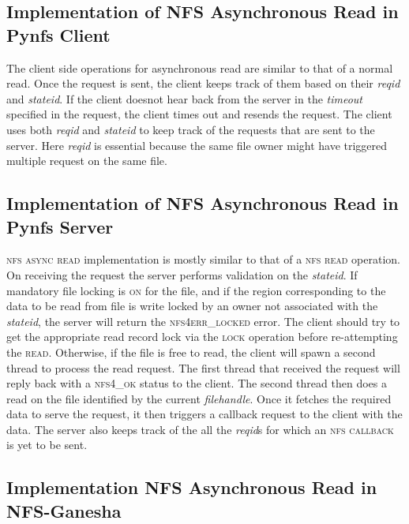 \subsection{Implementation of NFS Asynchronous Read in Pynfs Client}
 
The client side operations for asynchronous read are similar to that of a normal read. Once the request is sent, the client keeps track of them based on their \textit{reqid} and \textit{stateid}. If the client doesnot hear back from the server in the \textit{timeout} specified in the request, the client times out and resends the request. The client uses both \textit{reqid} and \textit{stateid} to keep track of the requests that are sent to the server.  Here \textit{reqid} is essential because the same file owner might have triggered multiple request on the same file.  
  
\subsection{Implementation of NFS Asynchronous Read in Pynfs Server}
 \textsc{nfs async read} implementation is mostly similar to that of a \textsc{nfs read} operation. On receiving the request the server performs validation on the \textit{stateid}. If mandatory file locking is \textsc{on} for the file, and if the region corresponding to the data to be read from file is write locked by an owner not associated with the \textit{stateid}, the server will return the \textsc{nfs4err\_locked} error. The client should try to get the appropriate read record lock via the \textsc{lock} operation before re-attempting the \textsc{read}. Otherwise, if the file is free to read, the client will spawn a second thread to process the read request. The first thread that received the request will reply back with a \textsc{nfs4\_ok} status to the client. The second thread then does a read on the file identified by the current \textit{filehandle}. Once it fetches the required data to serve the request, it then triggers a callback request to the client with the data. The server also keeps track of the all the \textit{reqid}s for which an \textsc{nfs callback} is yet to be sent.
 
    
\subsection{Implementation NFS Asynchronous Read in NFS-Ganesha}  

